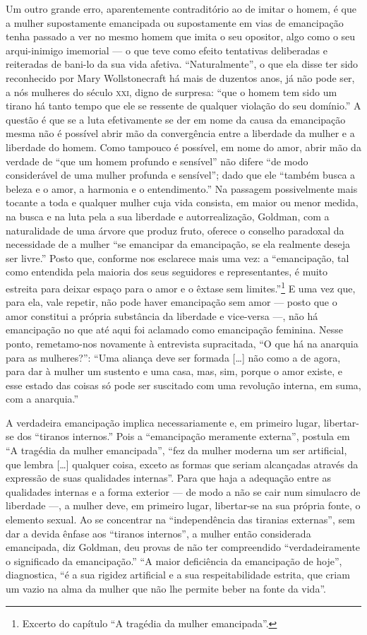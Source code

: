 Um outro grande erro, aparentemente contraditório ao de imitar o homem,
é que a mulher supostamente emancipada ou supostamente em vias de
emancipação tenha passado a ver no mesmo homem que imita o seu opositor,
algo como o seu arqui-inimigo imemorial --- o que teve como efeito
tentativas deliberadas e reiteradas de bani-lo da sua vida afetiva.
``Naturalmente'', o que ela disse ter sido reconhecido por Mary
Wollstonecraft há mais de duzentos anos, já não pode ser, a nós mulheres
do século \textsc{xxi}, digno de surpresa: ``que o homem tem sido um tirano há
tanto tempo que ele se ressente de qualquer violação do seu domínio.'' A
questão é que se a luta efetivamente se der em nome da causa da
emancipação mesma não é possível abrir mão da convergência entre a
liberdade da mulher e a liberdade do homem. Como tampouco é possível, em
nome do amor, abrir mão da verdade de ``que um homem profundo e
sensível'' não difere ``de modo considerável de uma mulher profunda e
sensível''; dado que ele ``também busca a beleza e o amor, a harmonia e
o entendimento.'' Na passagem possivelmente mais tocante a toda e
qualquer mulher cuja vida consista, em maior ou menor medida, na busca e
na luta pela a sua liberdade e autorrealização, Goldman, com a
naturalidade de uma árvore que produz fruto, oferece o conselho
paradoxal da necessidade de a mulher ``se emancipar da emancipação, se
ela realmente deseja ser livre.'' Posto que, conforme nos esclarece mais
uma vez: a ``emancipação, tal como entendida pela maioria dos seus
seguidores e representantes, é muito estreita para deixar espaço para o
amor e o êxtase sem limites.''\footnote{Excerto do capítulo ``A tragédia da mulher emancipada''.} E
uma vez que, para ela, vale repetir, não pode haver emancipação sem amor
--- posto que o amor constitui a própria substância da liberdade e
vice-versa ---, não há emancipação no que até aqui foi aclamado como
emancipação feminina. Nesse ponto, remetamo-nos novamente à entrevista
supracitada, ``O que há na anarquia para as mulheres?'': ``Uma aliança
deve ser formada {[}\ldots{]} não como a de agora, para dar à mulher um
sustento e uma casa, mas, sim, porque o amor existe, e esse estado das
coisas só pode ser suscitado com uma revolução interna, em suma, com a
anarquia.''

A verdadeira emancipação implica necessariamente e, em primeiro lugar,
libertar-se dos ``tiranos internos.'' Pois a ``emancipação meramente
externa'', postula em ``A tragédia da mulher emancipada'', ``fez da
mulher moderna um ser artificial, que lembra {[}\ldots{]} qualquer coisa,
exceto as formas que seriam alcançadas através da expressão de suas
qualidades internas''. Para que haja a adequação entre as qualidades
internas e a forma exterior --- de modo a não se cair num simulacro de
liberdade ---, a mulher deve, em primeiro lugar, libertar-se na sua
própria fonte, o elemento sexual. Ao se concentrar na ``independência
das tiranias externas'', sem dar a devida ênfase aos ``tiranos
internos'', a mulher então considerada emancipada, diz Goldman, deu
provas de não ter compreendido ``verdadeiramente o significado da
emancipação.'' ``A maior deficiência da emancipação de hoje'',
diagnostica, ``é a sua rigidez artificial e a sua respeitabilidade
estrita, que criam um vazio na alma da mulher que não lhe permite beber
na fonte da vida''.

